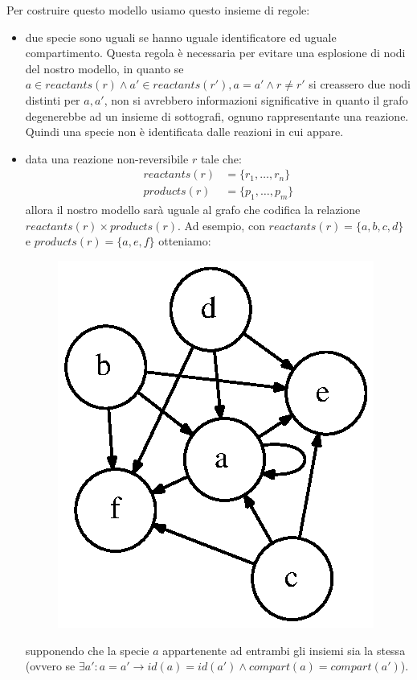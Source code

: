 Per costruire questo modello usiamo questo insieme di regole:
\begin{itemize}
\item due specie sono uguali se hanno uguale identificatore ed uguale
  compartimento. Questa regola \`e necessaria per evitare una
  esplosione di nodi del nostro modello, in quanto se $a \in
  reactants(r) \wedge a' \in reactants(r'), a = a' \wedge r \not = r'$
  si creassero due nodi distinti per $a, a'$, non si avrebbero
  informazioni significative in quanto il grafo degenerebbe ad un
  insieme di sottografi, ognuno rappresentante una reazione. Quindi
  una specie non \`e identificata dalle reazioni in cui appare.
\item data una reazione non-reversibile $r$ tale che:
  \begin{displaymath}
    \begin{split} 
      reactants(r) &= \{ r_{1}, \ldots, r_{n} \} \\
      products(r) &= \{ p_{1}, \ldots, p_{m} \}
    \end{split}
  \end{displaymath}
  allora il nostro modello sar\`a uguale al grafo che codifica la
  relazione $reactants(r) \times products(r)$. Ad esempio, con
  $reactants(r) = \{ a, b, c, d \}$ e $products(r) = \{a, e, f\}$
  otteniamo:

\begin{figure}[!htb]
\centering
\includegraphics{images/non-reversible-reaction-example.dot.eps}
\end{figure}
supponendo che la specie $a$ appartenente ad entrambi gli
insiemi sia la stessa (ovvero se $\exists a': a = a' \rightarrow id(a) =
id(a') \wedge compart(a) = compart(a')$).


\end{itemize}
